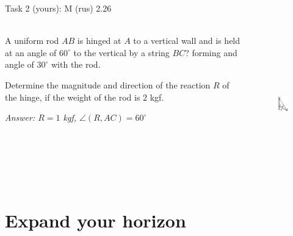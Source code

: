 \documentclass[aspectratio=169]{beamer}
\begin{document}
\begin{frame}[t]{Task 2 (yours): M (rus) 2.26}
\framesubtitle{}
    \begin{columns}[T,onlytextwidth]
        \begin{column}{0.49\textwidth}
            A uniform rod $AB$ is hinged at $A$ to a vertical wall and is held at an angle of $60^\circ$ to the vertical by a string $BC$? forming and angle of $30^\circ$ with the rod.
            \medskip

            Determine the magnitude and direction of the reaction $R$ of the hinge, if the weight of the rod is $2$ kgf.
            \bigskip

            \textit{Answer: $R=1$ kgf, $\angle(R, AC) = 60^\circ$}
        \end{column}
        \begin{column}{0.49\textwidth}
            \vspace*{-0.5cm}
            \begin{figure}[H]
                \centering\includegraphics[height=6cm,width=1\textwidth,keepaspectratio]{image5.png}
                \label{fig:image5}
            \end{figure}
        \end{column}
    \end{columns}
\end{frame}

\section*{Expand your horizon}
\end{document}
